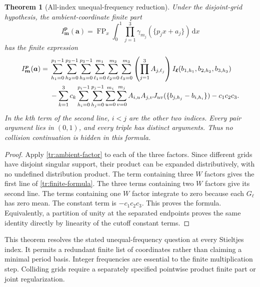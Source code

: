 \documentclass[11pt,a4paper]{article}
\numberwithin{equation}{section}
\newtheorem{theorem}{Theorem}[section]
\theoremstyle{definition}
\theoremstyle{remark}
\DeclareMathOperator{\FP}{FP}
\newcommand{\dd}{\,\mathrm d}
\begin{document}
\begin{theorem}[All-index unequal-frequency reduction]
\label{tr:finite-transport}
Under the disjoint-grid hypothesis, the ambient-coordinate finite part
\[
 I^{\boldsymbol p}_{\boldsymbol m}(\boldsymbol a)
 =\FP_x\int_0^1\prod_{j=1}^3
                 \gamma_{m_j}(\{p_jx+a_j\})\dd x
\]
has the finite expression
\begin{align}
 I^{\boldsymbol p}_{\boldsymbol m}(\boldsymbol a)
 ={}&\sum_{h_1=0}^{p_1-1}\sum_{h_2=0}^{p_2-1}\sum_{h_3=0}^{p_3-1}
       \sum_{\ell_1=0}^{m_1}\sum_{\ell_2=0}^{m_2}\sum_{\ell_3=0}^{m_3}
       \left(\prod_{j=1}^3A_{j,\ell_j}\right)
       I_{\boldsymbol\ell}(b_{1,h_1},b_{2,h_2},b_{3,h_3})
       \notag\\
 &-\sum_{k=1}^3c_k
    \sum_{h_i=0}^{p_i-1}\sum_{h_j=0}^{p_j-1}
    \sum_{u=0}^{m_i}\sum_{v=0}^{m_j}
        A_{i,u}A_{j,v}
        J_{uv}(\{b_{j,h_j}-b_{i,h_i}\})
       -c_1c_2c_3 .\label{tr:finite-formula}
\end{align}
In the $k$th term of the second line, $i<j$ are the other two indices.
Every pair argument lies in $(0,1)$, and every triple has distinct
arguments. Thus no collision continuation is hidden in this formula.
\end{theorem}
\begin{proof}
Apply \eqref{tr:ambient-factor} to each of the three factors. Since
different grids have disjoint singular support, their product can be
expanded distributively, with no undefined distribution product. The
term containing three $W$ factors gives the first line of
\eqref{tr:finite-formula}. The three terms containing two $W$ factors
give its second line. The terms containing one $W$ factor integrate to
zero because each $G_\ell$ has zero mean. The constant term is
$-c_1c_2c_3$. This proves the formula. Equivalently, a partition of unity
at the separated endpoints proves the same identity directly by linearity
of the cutoff constant terms.
\end{proof}

This theorem resolves the stated unequal-frequency question at every
Stieltjes index. It permits a redundant finite list of coordinates rather
than claiming a minimal period basis. Integer frequencies are essential
to the finite multiplication step. Colliding grids require a separately
specified pointwise product finite part or joint regularization.
\end{document}

